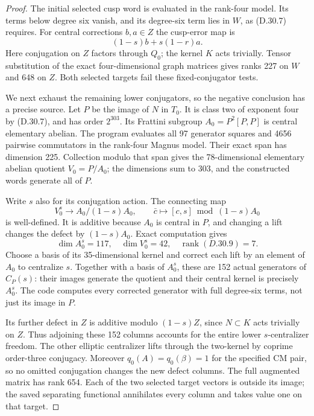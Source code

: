 \begin{proof}
The initial selected cusp word is evaluated in the
rank-four model. Its terms below degree six vanish,
and its degree-six term lies in $W$, as (D.30.7)
requires. For central corrections $b,a\in Z$ the
cusp-error map is
\[
                 (1-s)b+s(1-r)a.                     \tag{D.30.8}
\]
Here conjugation on $Z$ factors through $Q_0$; the
kernel $K$ acts trivially. Tensor substitution of the
exact four-dimensional graph matrices gives ranks 227
on $W$ and 648 on $Z$. Both selected targets fail these
fixed-conjugator tests.

We next exhaust the remaining lower conjugators, so
the negative conclusion has a precise source. Let
$P$ be the image of $N$ in $T_0$. It is class two of
exponent four by (D.30.7), and has order $2^{303}$.
Its Frattini subgroup
$A_0=P^2[P,P]$ is central elementary abelian. The
program evaluates all 97 generator squares and 4656
pairwise commutators in the rank-four Magnus model.
Their exact span has dimension 225. Collection modulo
that span gives the 78-dimensional elementary abelian
quotient $V_0=P/A_0$; the dimensions sum to 303, and
the constructed words generate all of $P$.

Write $s$ also for its conjugation action. The connecting
map
\[
 V_0^s\longrightarrow A_0/(1-s)A_0,
 \qquad \bar c\longmapsto[c,s]\bmod(1-s)A_0           \tag{D.30.9}
\]
is well-defined. It is additive because $A_0$ is central
in $P$, and changing a lift changes the defect by
$(1-s)A_0$. Exact computation gives
\[
 \dim A_0^s=117,\quad \dim V_0^s=42,\quad
 \operatorname{rank}(D.30.9)=7.                       \tag{D.30.10}
\]
Choose a basis of its 35-dimensional kernel and correct
each lift by an element of $A_0$ to centralize $s$.
Together with a basis of $A_0^s$, these are 152 actual
generators of $C_P(s)$: their images generate the
quotient and their central kernel is precisely $A_0^s$.
The code computes every corrected generator with full
degree-six terms, not just its image in $P$.

Its further defect in $Z$ is additive modulo
$(1-s)Z$, since $N\subset K$ acts trivially on $Z$.
Thus adjoining these 152 columns accounts for the
entire lower $s$-centralizer freedom. The other
elliptic centralizer lifts through the two-kernel by
coprime order-three conjugacy. Moreover
$q_0(A)=q_0(\beta)=1$ for the specified CM pair, so
no omitted conjugation changes the new defect columns.
The full augmented matrix has rank 654. Each of the
two selected target vectors is outside its image;
the saved separating functional annihilates every
column and takes value one on that target.


\end{proof}
